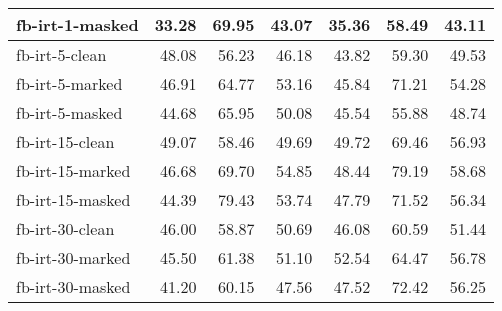\begin{tabular}{| l | r | r | r | r | r | r |}
    fb-irt-1-masked   & 33.28 & 69.95 & 43.07 & 35.36 & 58.49 & 43.11 \\ \hline
    fb-irt-5-clean    & 48.08 & 56.23 & 46.18 & 43.82 & 59.30 & 49.53 \\
    fb-irt-5-marked   & 46.91 & 64.77 & 53.16 & 45.84 & 71.21 & 54.28 \\
    fb-irt-5-masked   & 44.68 & 65.95 & 50.08 & 45.54 & 55.88 & 48.74 \\ \hline
    fb-irt-15-clean   & 49.07 & 58.46 & 49.69 & 49.72 & 69.46 & 56.93 \\
    fb-irt-15-marked  & 46.68 & 69.70 & 54.85 & 48.44 & 79.19 & 58.68 \\
    fb-irt-15-masked  & 44.39 & 79.43 & 53.74 & 47.79 & 71.52 & 56.34 \\ \hline
    fb-irt-30-clean   & 46.00 & 58.87 & 50.69 & 46.08 & 60.59 & 51.44 \\
    fb-irt-30-marked  & 45.50 & 61.38 & 51.10 & 52.54 & 64.47 & 56.78 \\
    fb-irt-30-masked  & 41.20 & 60.15 & 47.56 & 47.52 & 72.42 & 56.25 \\ \hline

\end{tabular}
